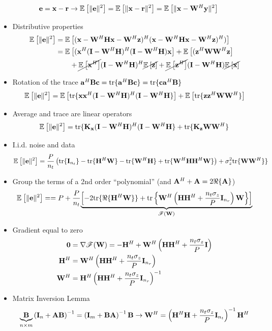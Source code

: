 \documentclass[xcolor=dvipsnames,aspectratio=169]{beamer}
\begin{document}
{    \vspace{-.1in}
    \begin{definition}
     $$\e=\x-\rr\to\Ex{}{\|\e\|^2}=\Ex{}{\|\x-\rr\|^2}=\Ex{}{\|\x-\W^H\y\|^2}$$
    \end{definition}
    \begin{itemize}
     \item Distributive properties
     \begin{equation*}
        \begin{split}
        \Ex{}{\|\e\|^2}&=\Ex{}{(\x-\W^H\Hb\x-\W^H\z)^H(\x-\W^H\Hb\x-\W^H\z)^H)}\\
                        &=\Ex{}{(\x^H(\I-\W^H\Hb)^H(\I-\W^H\Hb)\x}+\Ex{}{(\z^H\W\W^H\z}\\
                        &\qquad+\cancel{\Ex{}{\x^H}}(\I-\W^H\Hb)^H\cancel{\Ex{}{\z}}+\cancel{\Ex{}{\z^H}}(\I-\W^H\Hb)\cancel{\Ex{}{\x}}\\
        \end{split}
     \end{equation*}
     \item Rotation of the trace $\ab^H\B\cc=\tr\{\ab^H\B\cc\}=\tr\{\cc\ab^H\B\}$
     $$\Ex{}{\|\e\|^2}=\Ex{}{\tr\{\x\x^H(\I-\W^H\Hb)^H(\I-\W^H\Hb\}}+\Ex{}{\tr\{\z\z^H\W\W^H\}}$$
     \item Average and trace are linear operators
     $$\Ex{}{\|\e\|^2}=\tr\{\K_{\x}(\I-\W^H\Hb)^H(\I-\W^H\Hb\}+\tr\{\K_{\z}\W\W^H\}$$
     \item I.i.d. noise and data 
     $$\Ex{}{\|\e\|^2}=\frac{P}{n_t}\left(\tr\{\I_{n_t}\}-\tr\{\Hb^H\W\}-\tr\{\W^H\Hb\}+\tr\{\W^H\Hb\Hb^H\W\}\right)+\sigma_z^2\tr\{\W\W^H\}\}$$
     \item Group the terms of a 2nd order ``polynomial'' (and $\A^H+\A=2\Re\{\A\}$)
     $$\Ex{}{\|\e\|^2}==P+\frac{P}{n_t}\underset{\mathscr{F}(\W)}{\underbrace{\left[-2\tr\{\Re\{\Hb^H\W\}\}+\tr\left\{\W^H\left(\Hb\Hb^H+\frac{n_t\sigma_z}{P}\I_{n_r}\right)\W\right\}\right]}}$$
     \item Gradient equal to zero
       \begin{equation*}
        \begin{split}
        \zero &= \nabla \mathscr{F}(\W) =-\Hb^H+\W^H\left(\Hb\Hb^H+\frac{n_t\sigma_z}{P}\I\right)\\
                        \Hb^H&=\W^H\left(\Hb\Hb^H+\frac{n_t\sigma_z}{P}\I_{n_r}\right)\\
                        \W^H&=\Hb^H\left(\Hb\Hb^H+\frac{n_t\sigma_z}{P}\I_{n_r}\right)^{-1}\\
        \end{split}
        \end{equation*}
     \item Matrix Inversion Lemma
     $$\underset{n\times m}{\underbrace{\B}}\left(\I_{n}+\A\B\right)^{-1}=\left(\I_{m}+\B\A\right)^{-1}\B\to \W^H=\left(\Hb^H\Hb+\frac{n_t\sigma_z}{P}\I_{n_t}\right)^{-1}\Hb^H$$
    \end{itemize}
    
}
\end{document}

